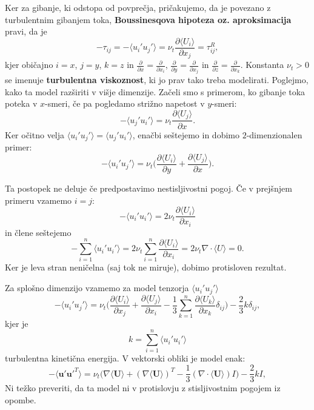 \documentclass[mat2, tisk]{fmfdelo}
\newcommand{\bd}{\textbf}
\begin{document}
Ker za gibanje, ki odstopa od povprečja, pričakujemo, da je povezano z turbulentnim
gibanjem toka, \bd{Boussinesqova hipoteza oz. aproksimacija} pravi, da je 
\begin{equation}
-\tau_{ij} = -\langle u_i' u_j'\rangle = \nu_t \frac{\partial \langle U_i\rangle}{\partial x_j} = \tau_{ij}^R,
\end{equation}
kjer običajno $i=x$, $j=y$, $k=z$ in $\frac{\partial}{\partial x} = \frac{\partial}{\partial x_i}$, $\frac{\partial}{\partial y} = \frac{\partial}{\partial x_j}$ in 
$\frac{\partial}{\partial z} = \frac{\partial}{\partial x_k}$. Konstanta $\nu_t>0$ se imenuje \bd{turbulentna viskoznost}, 
ki jo prav tako treba modelirati. Poglejmo, kako ta model razširiti v višje dimenzije. 
Začeli smo s primerom, ko gibanje toka poteka v $x$-smeri, če pa 
pogledamo strižno napetost v $y$-smeri:
$$
-\langle u_j' u_i' \rangle = \nu_t \frac{\partial \langle U_j\rangle}{\partial x}.
$$
Ker očitno velja $\langle u_i' u_j' \rangle = \langle u_j' u_i' \rangle$, enačbi seštejemo in 
dobimo $2$-dimenzionalen primer: 
\begin{equation}
\label{eq:2dmodel}
-\langle u_i' u_j' \rangle = \nu_t \Big(\frac{\partial \langle U_i\rangle}{\partial y} + \frac{\partial \langle U_j\rangle}{\partial x}\Big).
\end{equation}
\begin{opomba}
Ta postopek ne deluje če predpostavimo nestisljivostni pogoj. 
Če v prejšnjem primeru vzamemo $i=j$:
$$
-\langle u_i' u_i' \rangle = 2\nu_t \frac{\partial \langle U_i\rangle}{\partial x_i}
$$
in člene seštejemo 
$$
-\sum_{i=1}^n \langle u_i' u_i' \rangle = 2\nu_t \sum_{i=1}^n \frac{\partial \langle U_i\rangle}{\partial x_i} = 2\nu_t \nabla\cdot \langle U\rangle = 0.
$$
Ker je leva stran neničelna (saj tok ne miruje), dobimo protisloven rezultat.
\end{opomba}
Za splošno dimenzijo vzamemo za model tenzorja $\langle u_i' u_j' \rangle$
\begin{equation}
- \langle u_i' u_j' \rangle = \nu_t \Big(\frac{\partial\langle U_i\rangle}{\partial x_j} + \frac{\partial\langle U_j\rangle}{\partial x_i}
- \frac{1}{3} \sum_{k=1}^n \frac{\partial\langle U_k\rangle}{\partial x_k}\delta_{ij}\Big) - \frac{2}{3}k\delta_{ij},
\end{equation}
kjer je 
$$k = \sum_{i=1}^n \langle u_i' u_i' \rangle$$ 
turbulentna kinetična energija. V vektorski obliki je model enak:
\begin{equation}
-\langle \bd{u}' \bd{u}'^T \rangle = \nu_t \Big(\nabla\langle \bd{U}\rangle + (\nabla\langle \bd{U}\rangle)^T - \frac{1}{3}(\nabla\cdot\langle \bd{U}\rangle)I\Big) - \frac{2}{3}kI,
\end{equation}
Ni težko preveriti, da ta model ni v protislovju z stisljivostnim pogojem iz opombe.
\end{document}
